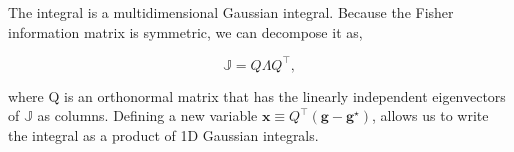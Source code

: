 
\noindent
The integral is a multidimensional Gaussian integral. Because the Fisher information matrix is symmetric, we can decompose it as,

\begin{equation*}
    \mathbb{J} = Q \Lambda Q^\intercal,
\end{equation*}

\noindent
where Q is an orthonormal matrix that has the linearly independent eigenvectors of $\mathbb{J}$ as columns. Defining a new variable $\mathbf{x} \equiv Q^\intercal (\mathbf{g} - \mathbf{g}^\star)$, allows us to write the integral as a product of 1D Gaussian integrals.

